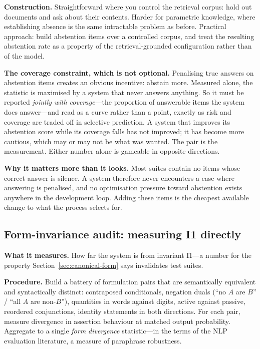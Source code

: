 \documentclass[11pt]{article}
\theoremstyle{plain}
\theoremstyle{definition}
\begin{document}
\textbf{Construction.} Straightforward where you control the retrieval corpus:
hold out documents and ask about their contents. Harder for parametric knowledge,
where establishing absence is the same intractable problem as before. Practical
approach: build abstention items over a controlled corpus, and treat the resulting
abstention rate as a property of the retrieval-grounded configuration rather than
of the model.

\textbf{The coverage constraint, which is not optional.} Penalising true answers on
abstention items creates an obvious incentive: abstain more. Measured alone, the
statistic is maximised by a system that never answers anything. So it must be reported
\emph{jointly with coverage}---the proportion of answerable items the system does
answer---and read as a curve rather than a point, exactly as risk and coverage are
traded off in selective prediction. A system that improves its abstention score while
its coverage falls has not improved; it has become more cautious, which may or may not
be what was wanted. The pair is the measurement. Either number alone is gameable in
opposite directions.

\textbf{Why it matters more than it looks.} Most suites contain no items whose
correct answer is silence. A system therefore never encounters a case where
answering is penalised, and no optimisation pressure toward abstention exists
anywhere in the development loop. Adding these items is the cheapest available
change to what the process selects for.

\subsection{Form-invariance audit: measuring I1 directly}
\label{sec:form-audit}

\textbf{What it measures.} How far the system is from invariant I1---a number for
the property Section~\ref{sec:canonical-form} says invalidates test suites.

\textbf{Procedure.} Build a battery of formulation pairs that are semantically
equivalent and syntactically distinct: contraposed conditionals, negation duals
(``no $A$ are $B$'' / ``all $A$ are non-$B$''), quantities in words against digits,
active against passive, reordered conjunctions, identity statements in both
directions. For each pair, measure divergence in assertion behaviour at matched
output probability. Aggregate to a single \emph{form divergence} statistic---in the terms of the NLP
evaluation literature, a measure of paraphrase robustness.
\end{document}
